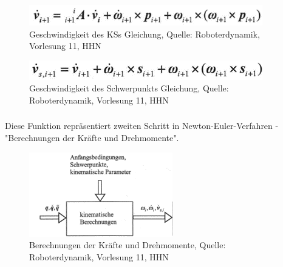 	\begin{figure}[!htbp]
		\centering
		\includegraphics[width=1\linewidth]{grafic/v_dot_gleichung}
		\caption{Geschwindigkeit des KSs Gleichung, Quelle: Roboterdynamik, Vorlesung 11, HHN}
		\label{fig:v_dot_gleichung}
	\end{figure}

	\begin{figure}[!htbp]
		\centering
		\includegraphics[width=1\linewidth]{grafic/vs_dot_gleichung}
		\caption{Geschwindigkeit des Schwerpunkts Gleichung, Quelle: Roboterdynamik, Vorlesung 11, HHN}
		\label{fig:vs_dot_gleichung}
	\end{figure}


\subsubsection{}

Diese Funktion repräsentiert zweiten Schritt in Newton-Euler-Verfahren - "Berechnungen der Kräfte und Drehmomente".

	\begin{figure}[!htbp]
		\centering
		\includegraphics[width=1\linewidth]{grafic/compute_kinematics_diagramm}
		\caption{Berechnungen der Kräfte und Drehmomente, Quelle: Roboterdynamik, Vorlesung 11, HHN}
		\label{fig:sensoren_subsystem}
	\end{figure}

